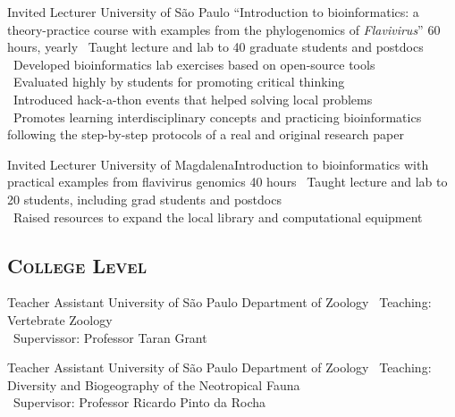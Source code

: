 \documentclass[11pt, letterpaper, sans]{moderncv}
\begin{document}
\vspace{.5em}

	{Invited Lecturer}
	{University of São Paulo}
	{``Introduction to bioinformatics: a theory-practice course with examples from the phylogenomics of \emph{Flavivirus}''}
	{60 hours, yearly}
	{
		\textbullet~Taught lecture and lab to 40 graduate students and postdocs\\
		\textbullet~Developed bioinformatics lab exercises based on open-source tools\\
		\textbullet~Evaluated highly by students for promoting critical thinking\\
		\textbullet~Introduced hack-a-thon events that helped solving local problems\\
		\textbullet~Promotes learning interdisciplinary concepts and practicing bioinformatics following the step-by-step protocols of a real and original research paper
	}

\vspace{.5em}

	{Invited Lecturer}
	{University of Magdalena}{Introduction to bioinformatics with practical examples from flavivirus genomics}
	{40 hours}
	{
		\textbullet~Taught lecture and lab to 20 students, including grad students and postdocs\\
		\textbullet~Raised resources to expand the local library and computational equipment
	}


\clearpage

	\subsection{\textsc{College Level}}
\vspace{.5em}

	{Teacher Assistant}
	{University of São Paulo}
	{Department of Zoology}
	{}
	{
		\textbullet~Teaching: Vertebrate Zoology\\
		\textbullet~Supervissor: Professor Taran Grant
	}

\vspace{.5em}

	{Teacher Assistant}
	{University of São Paulo}
	{Department of Zoology}
	{}
	{\textbullet~Teaching: Diversity and Biogeography of the Neotropical Fauna\\\textbullet~Supervisor: Professor Ricardo Pinto da Rocha
	}

\vspace{.5em}
\end{document}
